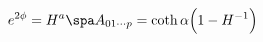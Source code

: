\begin{equation}
e^{2\phi} = H^{a}
\spa
A_{01 \cdots p}
= \coth \alpha \Big( 1 - H^{-1} \Big)
\end{equation}

